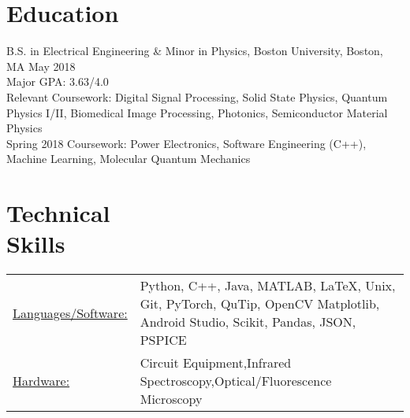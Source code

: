 \documentclass[margin]{res}
\begin{document}
 
 
\address{{\bf Present Address} \\ 39 Buswell St Apt 08 \\ Boston, MA 02215  \\
        (781) 664-7151 \\ Linkedin - www.linkedin.com/in/sonam-ghosh-a6ab09100 }
        
\address{{\bf Permanent Address} \\ 9350 Double R Blvd Apt 3814 \\ Reno, NV 89521 \\
        sonamg@bu.edu }


\begin{resume} 
 

\section{Education} 
B.S. in Electrical Engineering \& Minor in Physics, Boston University, Boston, MA \hfill May 2018 \\
Major GPA: 3.63/4.0 \\
Relevant Coursework: Digital Signal Processing, Solid State Physics, Quantum Physics I/II, Biomedical Image Processing, Photonics, Semiconductor Material Physics \\
Spring 2018 Coursework: Power Electronics, Software Engineering (C++), Machine Learning, Molecular Quantum Mechanics 



\section{Technical \\ Skills}
   \begin{tabular}{l p{4.5in}}
    \underline{Languages/Software:} & Python, C++, Java, MATLAB, LaTeX, Unix, Git, PyTorch, QuTip,
    OpenCV Matplotlib, Android Studio, Scikit, Pandas, JSON, PSPICE \\
     \underline{Hardware:} & Circuit Equipment,Infrared Spectroscopy,Optical/Fluorescence Microscopy \\
 \end{tabular}






\end{resume}
\end{document}
